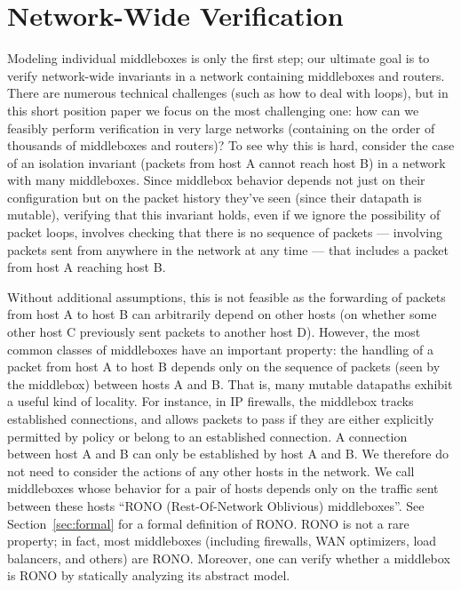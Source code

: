\section{Network-Wide Verification}
\label{sec:modelnet}

Modeling individual middleboxes is only the first step; our ultimate goal is to verify network-wide invariants in a network containing middleboxes and routers.
There are numerous technical challenges (such as how to deal with loops), but in this short position paper we focus on the most challenging one: how can we feasibly perform verification in very large networks (containing on the order of thousands of middleboxes and routers)? To see why this is hard, consider the case of an isolation invariant (packets from host A cannot reach host B) in a network with many middleboxes. Since middlebox behavior depends not just on their configuration but on the packet history they've seen (since their datapath is mutable), verifying that this invariant holds, even if we ignore the possibility of packet loops,
involves checking that there is no sequence of packets --- involving packets sent from anywhere in the network at any time --- that includes a packet from host A reaching host B.


Without additional assumptions, this is not feasible as the forwarding of packets from host A to host B can arbitrarily depend on other hosts (\eg on whether some other host C previously sent packets to another host D). However, the most common classes of middleboxes have an important property: the handling of a packet from host A to host B depends only on the sequence of packets (seen by the middlebox) between hosts A and B. That is, many mutable datapaths exhibit a useful kind of locality.
For instance, in IP
firewalls, the middlebox tracks established connections, and allows packets to pass if they are either explicitly permitted by
policy or belong to an established connection. A connection between host A and B can only be established by host A and B. We therefore do not need to consider the
actions of any other hosts in the network. We call middleboxes whose behavior for a pair of hosts depends only on the traffic sent between these hosts ``RONO (Rest-Of-Network Oblivious) middleboxes''. See Section~\ref{sec:formal} for a formal definition of RONO. RONO is not a rare property; in fact, most middleboxes (including firewalls, WAN optimizers, load balancers, and others) are RONO.  Moreover, one can verify whether a middlebox is RONO by statically analyzing its abstract model.


